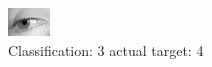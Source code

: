 \begin{figure}[h!]
\begin{center}
\includegraphics[width=0.60\columnwidth]{figures/ID2896_class_3_target_4.png}
\end{center}
\caption{ Classification: 3 actual target: 4}
\label{fig:ID2896_class_3_target_4}
\end{figure}
